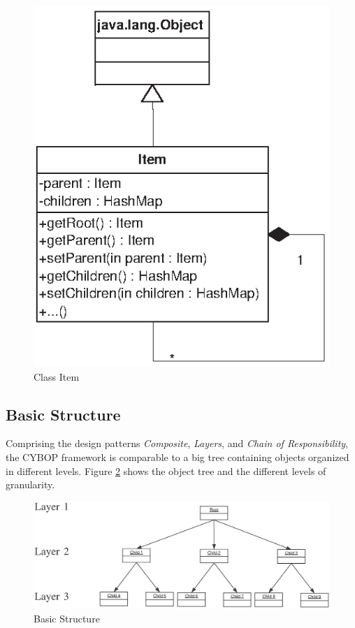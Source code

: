 \begin{figure}[ht]
    \begin{center}
       \includegraphics[scale=0.8]{eps/item.eps}
       \caption{Class Item}
       \label{class_item_figure}
    \end{center}
\end{figure}

\subsection{Basic Structure}
\label{basic_structure_heading}

Comprising the design patterns \emph{Composite}, \emph{Layers}, and
\emph{Chain of Responsibility}, the CYBOP framework is comparable to a big tree
containing objects organized in different levels. Figure \ref{basic_structure_figure}
shows the object tree and the different levels of granularity.

\begin{figure}[ht]
    \begin{center}
       \includegraphics[scale=0.3]{eps/framework-structure.eps}
       \caption{Basic Structure}
       \label{basic_structure_figure}
    \end{center}
\end{figure}

